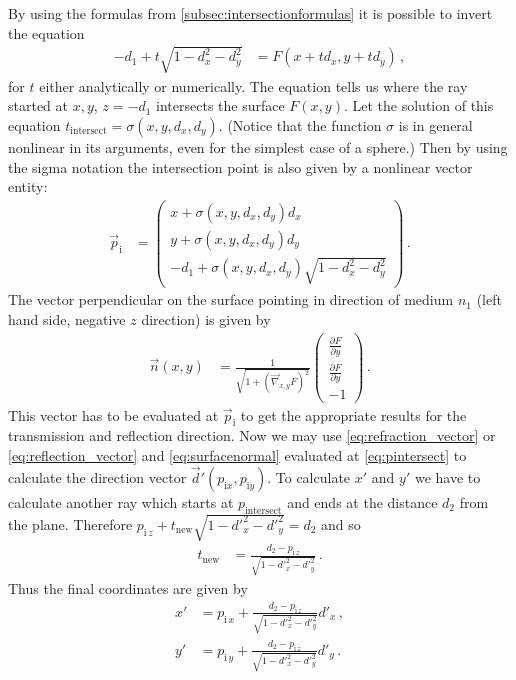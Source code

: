 \documentclass[12pt,a4paper,twoside,openright,BCOR10mm,headsepline,titlepage,abstracton,chapterprefix,final]{scrreprt}
\begin{document}
By using the formulas from \ref{subsec:intersectionformulas} it is possible to invert the equation 
\begin{align}
-d_1 + t \sqrt{1-d_x^2-d_y^2} &= F(x + t d_x, y + t d_y)\,,\label{eq:genintersection} 
\end{align}
for $t$ either analytically or numerically. The equation tells
us where the ray started at $x, y$, $z = -d_1$ intersects the surface $F(x, y)$. Let the solution
of this equation $t_\text{intersect} = \sigma(x, y, d_x, d_y)$. (Notice that the function $\sigma$
is in general nonlinear in its arguments, even for the simplest case of a sphere.) Then by using the 
sigma notation the intersection point is also given by a nonlinear vector entity:
\begin{align}
 \vec{p}_\text{i} &= \begin{pmatrix} x + \sigma(x,y,d_x,d_y) d_x \\ y + \sigma(x,y,d_x,d_y) d_y \\ -d_1 + \sigma(x,y,d_x,d_y) \sqrt{1 - d_x^2 - d_y^2} \end{pmatrix}\,.\label{eq:pintersect}
\end{align}
The vector perpendicular on the surface pointing in direction of medium $n_1$ (left hand side, negative $z$ direction) is given
by
\begin{align}
 \vec{n}(x, y) &= 
  \frac{1}{\sqrt{1 + (\vec{\nabla}_{x,y} F)^2}} 
  \begin{pmatrix} \frac{\partial F}{\partial y} \\ \frac{\partial F}{\partial y} \\ -1 \end{pmatrix}\,.\label{eq:surfacenormal}
\end{align}
This vector has to be evaluated at $\vec{p}_\text{i}$ to get the appropriate results for
the transmission and reflection direction. Now we may use \eqref{eq:refraction_vector} or \eqref{eq:reflection_vector}
and \eqref{eq:surfacenormal} evaluated at \eqref{eq:pintersect} to calculate the direction vector $\vec{d}'(p_{\text{i} x}, p_{\text{i} y})$.
To calculate $x'$ and $y'$ we have to calculate another ray which starts at $p_\text{intersect}$ and ends at the
distance $d_2$ from the plane. Therefore $p_{\text{i}\,z} + t_\text{new} \sqrt{1 - {d'}_x^2 - {d'}_y^2} = d_2$ and so
\begin{align}
t_\text{new} &= \frac{d_2 - p_{\text{i}\,z}}{\sqrt{1 - {d'}_x^2 - {d'}_y^2}}\,.
\end{align}
Thus the final coordinates are given by
\begin{subequations}
\begin{align}
 x' &= p_{\text{i}\,x} + \frac{d_2 - p_{\text{i}\,z}}{\sqrt{1 - {d'}_x^2 - {d'}_y^2}} {d'}_x\,,\\
 y' &= p_{\text{i}\,y} + \frac{d_2 - p_{\text{i}\,z}}{\sqrt{1 - {d'}_x^2 - {d'}_y^2}} {d'}_y\,.
\end{align}
\end{subequations}
\end{document}
